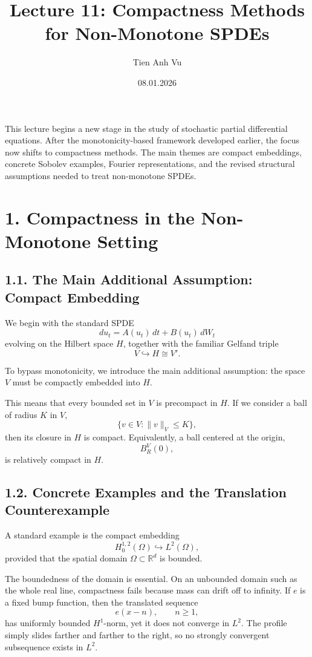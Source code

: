 \documentclass[11pt]{article}
\title{Lecture 11: Compactness Methods for Non-Monotone SPDEs}
\date{08.01.2026}
\author{Tien Anh Vu}
\theoremstyle{definition}
\theoremstyle{remark}
\begin{document}
\maketitle

This lecture begins a new stage in the study of stochastic partial differential equations. After the monotonicity-based framework developed earlier, the focus now shifts to compactness methods. The main themes are compact embeddings, concrete Sobolev examples, Fourier representations, and the revised structural assumptions needed to treat non-monotone SPDEs.

\section*{1. Compactness in the Non-Monotone Setting}

\subsection*{1.1. The Main Additional Assumption: Compact Embedding}
We begin with the standard SPDE
\[
du_t=A(u_t)\,dt+B(u_t)\,dW_t
\]
evolving on the Hilbert space \(H\), together with the familiar Gelfand triple
\[
V\hookrightarrow H\cong V'.
\]

To bypass monotonicity, we introduce the main additional assumption: the space \(V\) must be compactly embedded into \(H\).

This means that every bounded set in \(V\) is precompact in \(H\). If we consider a ball of radius \(K\) in \(V\),
\[
\{v\in V:\|v\|_V\le K\},
\]
then its closure in \(H\) is compact. Equivalently, a ball centered at the origin,
\[
B_R^V(0),
\]
is relatively compact in \(H\).

\subsection*{1.2. Concrete Examples and the Translation Counterexample}
A standard example is the compact embedding
\[
H_0^{1,2}(\Omega)\hookrightarrow L^2(\Omega),
\]
provided that the spatial domain \(\Omega\subset \mathbb R^d\) is bounded.

The boundedness of the domain is essential. On an unbounded domain such as the whole real line, compactness fails because mass can drift off to infinity. If \(e\) is a fixed bump function, then the translated sequence
\[
e(x-n), \qquad n\ge 1,
\]
has uniformly bounded \(H^1\)-norm, yet it does not converge in \(L^2\). The profile simply slides farther and farther to the right, so no strongly convergent subsequence exists in \(L^2\).
\end{document}
